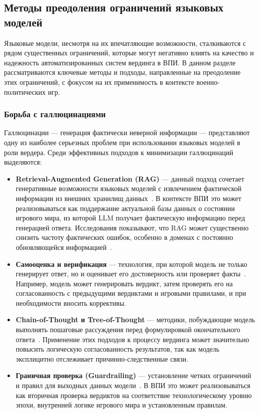 \subsection{Методы преодоления ограничений языковых моделей}

Языковые модели, несмотря на их впечатляющие возможности, сталкиваются с рядом существенных ограничений, которые могут негативно влиять на качество и надежность автоматизированных систем вердинга в ВПИ. В данном разделе рассматриваются ключевые методы и подходы, направленные на преодоление этих ограничений, с фокусом на их применимость в контексте военно-политических игр.

\subsubsection{Борьба с галлюцинациями}

Галлюцинации — генерация фактически неверной информации — представляют одну из наиболее серьезных проблем при использовании языковых моделей в роли вердера. Среди эффективных подходов к минимизации галлюцинаций выделяются:

\begin{itemize}
    \item \textbf{Retrieval-Augmented Generation (RAG)} — данный подход сочетает генеративные возможности языковых моделей с извлечением фактической информации из внешних хранилищ данных~\cite{lewis2020retrieval}. В контексте ВПИ это может реализовываться как поддержание актуальной базы данных о состоянии игрового мира, из которой LLM получает фактическую информацию перед генерацией ответа. Исследования показывают, что RAG может существенно снизить частоту фактических ошибок, особенно в доменах с постоянно обновляющейся информацией~\cite{ram2023context}.

    \item \textbf{Самооценка и верификация} — технология, при которой модель не только генерирует ответ, но и оценивает его достоверность или проверяет факты~\cite{weng2023large}. Например, модель может генерировать вердикт, затем проверять его на согласованность с предыдущими вердиктами и игровыми правилами, и при необходимости вносить коррективы.

    \item \textbf{Chain-of-Thought и Tree-of-Thought} — методики, побуждающие модель выполнять пошаговые рассуждения перед формулировкой окончательного ответа~\cite{wei2022chain, yao2023tree}. Применение этих подходов к процессу вердинга может значительно повысить логическую согласованность результатов, так как модель эксплицитно отслеживает причинно-следственные связи.

    \item \textbf{Граничная проверка (Guardrailing)} — установление четких ограничений и правил для выходных данных модели~\cite{welbl2021challenges}. В ВПИ это может реализовываться как вторичная проверка вердиктов на соответствие технологическому уровню эпохи, внутренней логике игрового мира и установленным правилам.
\end{itemize}

